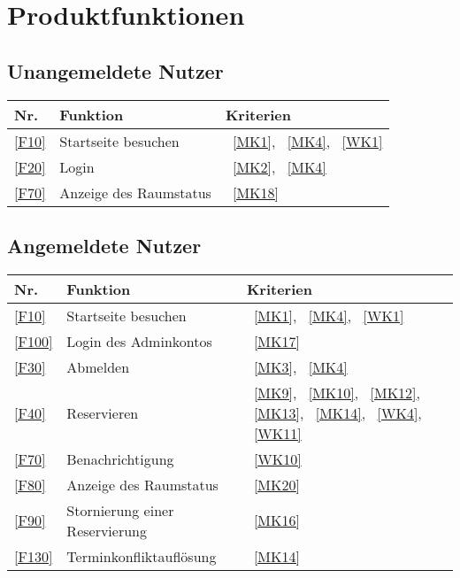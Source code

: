 

\chapter{Produktfunktionen}
\label{chap:product_functions}


\section{Unangemeldete Nutzer}\label{sec:unangemeldete-benutzer-funktionen}
\begin{table}[htbp]
    \centering
    \begin{tabularx}{\textwidth}{ l|X|>{\raggedright\arraybackslash}X }
        \textbf{Nr.} & \textbf{Funktion} & \textbf{Kriterien} \\ \hline\hline
        \ref{F10} & Startseite besuchen &~\ref{MK1}, ~\ref{MK4}, ~\ref{WK1} \\
        \ref{F20} & Login &~\ref{MK2}, ~\ref{MK4} \\
        \ref{F70} & Anzeige des Raumstatus &~\ref{MK18} \\
    \end{tabularx}
    \label{tab:non_loggedin_functions}
\end{table}

\section{Angemeldete Nutzer}\label{sec:angemeldete-benutzer-funktionen}
\begin{table}[htbp]
    \centering
    \begin{tabularx}{\textwidth}{ l|X|>{\raggedright\arraybackslash}X }
        \textbf{Nr.} & \textbf{Funktion} & \textbf{Kriterien} \\ \hline\hline
        \ref{F10} & Startseite besuchen &~\ref{MK1}, ~\ref{MK4}, ~\ref{WK1} \\
        \ref{F100} & Login des Adminkontos &~\ref{MK17} \\
        \ref{F30} & Abmelden &~\ref{MK3}, ~\ref{MK4} \\
        \ref{F40} & Reservieren &~\ref{MK9}, ~\ref{MK10}, ~\ref{MK12}, ~\ref{MK13}, ~\ref{MK14}, ~\ref{WK4}, ~\ref{WK11} \\
        \ref{F70} & Benachrichtigung &~\ref{WK10} \\
        \ref{F80} & Anzeige des Raumstatus &~\ref{MK20} \\
        \ref{F90} & Stornierung einer Reservierung &~\ref{MK16} \\
        \ref{F130} & Terminkonfliktauflösung &~\ref{MK14} \\
    \end{tabularx}
    \label{tab:loggedin_functions}
\end{table}
\newpage
